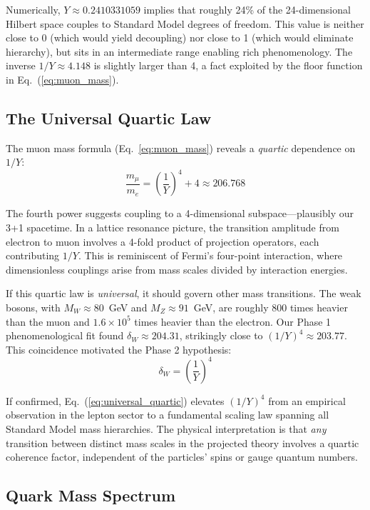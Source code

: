 \documentclass[11pt,a4paper]{article}
\begin{document}
Numerically, $Y \approx 0.2410331059$ implies that roughly 24\% of the 24-dimensional Hilbert space couples to Standard Model degrees of freedom. This value is neither close to 0 (which would yield decoupling) nor close to 1 (which would eliminate hierarchy), but sits in an intermediate range enabling rich phenomenology. The inverse $1/Y \approx 4.148$ is slightly larger than 4, a fact exploited by the floor function in Eq.~(\ref{eq:muon_mass}).

\subsection{The Universal Quartic Law}

The muon mass formula (Eq.~\ref{eq:muon_mass}) reveals a \emph{quartic} dependence on $1/Y$:
\begin{equation}
\frac{m_\mu}{m_e} = \left(\frac{1}{Y}\right)^4 + 4 \approx 206.768
\end{equation}

The fourth power suggests coupling to a 4-dimensional subspace---plausibly our 3+1 spacetime. In a lattice resonance picture, the transition amplitude from electron to muon involves a 4-fold product of projection operators, each contributing $1/Y$. This is reminiscent of Fermi's four-point interaction, where dimensionless couplings arise from mass scales divided by interaction energies.

If this quartic law is \emph{universal}, it should govern other mass transitions. The weak bosons, with $M_W \approx 80$~GeV and $M_Z \approx 91$~GeV, are roughly 800 times heavier than the muon and $1.6 \times 10^5$ times heavier than the electron. Our Phase 1 phenomenological fit found $\delta_W \approx 204.31$, strikingly close to $(1/Y)^4 \approx 203.77$. This coincidence motivated the Phase 2 hypothesis:
\begin{equation}
\delta_W = \left(\frac{1}{Y}\right)^4
\label{eq:universal_quartic}
\end{equation}

If confirmed, Eq.~(\ref{eq:universal_quartic}) elevates $(1/Y)^4$ from an empirical observation in the lepton sector to a fundamental scaling law spanning all Standard Model mass hierarchies. The physical interpretation is that \emph{any} transition between distinct mass scales in the projected theory involves a quartic coherence factor, independent of the particles' spins or gauge quantum numbers.

\subsection{Quark Mass Spectrum}
\end{document}
